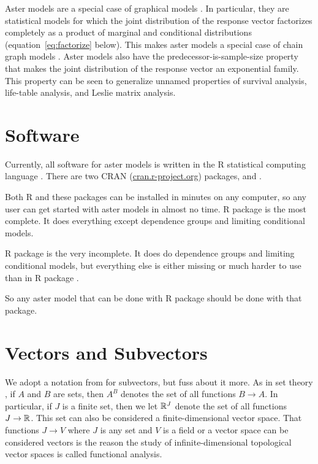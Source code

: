 Aster models are a special case of graphical models \citep{lauritzen}.
In particular, they are statistical models for which the joint distribution
of the response vector factorizes completely as a product of marginal and
conditional distributions (equation~\eqref{eq:factorize} below).
This makes aster models a special case of chain graph models
\citep[Sections~2.1.1 and~3.2.3]{lauritzen}.
Aster models also have the predecessor-is-sample-size property
that makes the joint distribution of the response vector an exponential
family.  This property can be seen to generalize unnamed properties
of survival analysis, life-table analysis, and Leslie matrix analysis.

\section{Software}
\label{sec:software}

Currently, all software for aster models is written in the R statistical
computing language \citep{r-core}.  There are two CRAN
(\url{cran.r-project.org}) packages,  \citep{aster-package} and
 \citep{aster2-package}.

Both R and these packages can be installed in minutes on any computer,
so any user can get started with aster models in almost no time.
R package  is the most complete.
It does everything except dependence groups
and limiting conditional models.

R package  is the very incomplete.
It does do dependence groups and limiting conditional models, but everything
else is either missing or much harder to use than in R package .

So any aster model that can be done with R package  should
be done with that package.

\section{Vectors and Subvectors}

We adopt a notation from \citet{lauritzen} for subvectors, but fuss about it
more.  As in set theory \citep[Section~8]{halmos-set-theory}, if $A$ and $B$
are sets, then $A^B$ denotes the set of all functions $B \to A$.
In particular, if $J$ is a finite set, then we let $\mathbb{R}^J$ denote
the set of all functions $J \to \mathbb{R}$.  This set can also be considered
a finite-dimensional vector space.  That functions $J \to V$ where $J$ is
any set and $V$ is a field or a vector space can be considered
vectors is the reason the study of infinite-dimensional topological vector
spaces is called functional analysis.

